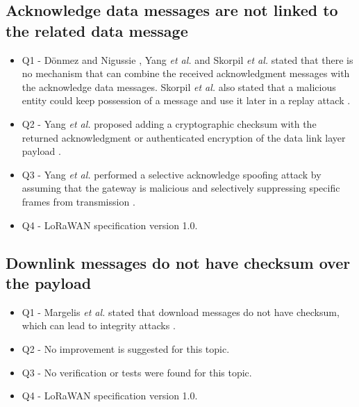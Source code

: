 \documentclass[manuscript,screen,review=false]{acmart}
\begin{document}
\subsection{Acknowledge data messages are not linked to the related data message}

\begin{itemize}
\item Q1 - D\"onmez and Nigussie \cite{03_security_LoRaWANv1.1_scenarios}, Yang {\it et al.} \cite{37_security_vulnerabilities_lorawan} and Skorpil {\it et al.} \cite{59_IoT_security_overview_practical_demonstration} stated that there is no mechanism that can combine the received acknowledgment messages with the acknowledge data messages. Skorpil {\it et al.} also stated that a malicious entity could keep possession of a message and use it later in a replay attack \cite{59_IoT_security_overview_practical_demonstration}.

\item Q2 - Yang {\it et al.} proposed adding a cryptographic checksum with the returned acknowledgment or authenticated encryption of the data link layer payload \cite{37_security_vulnerabilities_lorawan}.

\item Q3 - Yang {\it et al.} performed a selective acknowledge spoofing attack by assuming that the gateway is malicious and selectively suppressing specific frames from transmission \cite{37_security_vulnerabilities_lorawan}.

\item Q4 - LoRaWAN specification version 1.0.
\end{itemize}

\subsection{Downlink messages do not have checksum over the payload}

\begin{itemize}
\item Q1 - Margelis {\it et al.} stated that download messages do not have checksum, which can lead to integrity attacks \cite{70_low_throughput_networks_IoT}.

\item Q2 - No improvement is suggested for this topic.

\item Q3 - No verification or tests were found for this topic.

\item Q4 - LoRaWAN specification version 1.0.
\end{itemize}
\end{document}

